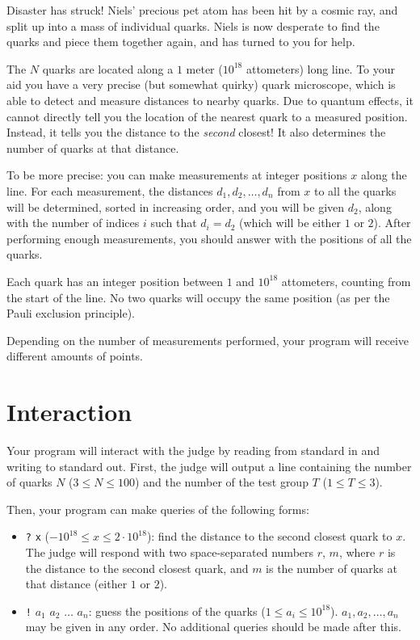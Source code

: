 Disaster has struck!
Niels' precious pet atom has been hit by a cosmic ray, and split up into a mass of individual quarks.
Niels is now desperate to find the quarks and piece them together again, and has turned to you for help.

The $N$ quarks are located along a $1$ meter ($10^{18}$ attometers) long line.
To your aid you have a very precise (but somewhat quirky) quark microscope, which is able to detect and measure distances to nearby quarks.
Due to quantum effects, it cannot directly tell you the location of the nearest quark to a measured position.
Instead, it tells you the distance to the \emph{second} closest!
It also determines the number of quarks at that distance.

To be more precise: you can make measurements at integer positions $x$ along the line.
For each measurement, the distances $d_1, d_2, \ldots, d_n$ from $x$ to all the quarks will be determined, sorted in increasing order,
and you will be given $d_2$, along with the number of indices $i$ such that $d_i = d_2$ (which will be either $1$ or $2$).
After performing enough measurements, you should answer with the positions of all the quarks.

Each quark has an integer position between $1$ and $10^{18}$ attometers, counting from the start of the line.
No two quarks will occupy the same position (as per the Pauli exclusion principle).

Depending on the number of measurements performed, your program will receive different amounts of points.

\section*{Interaction}
Your program will interact with the judge by reading from standard in and writing to standard out.
First, the judge will output a line containing the number of quarks $N$ ($3 \le N \le 100$) and the number of the test group $T$ ($1 \le T \le 3$).

Then, your program can make queries of the following forms:

\begin{itemize}
  \item \texttt{?} \texttt{x} ($-10^{18} \le x \le 2\cdot 10^{18}$): find the distance to the second closest quark to $x$.
    The judge will respond with two space-separated numbers $r$, $m$,
    where $r$ is the distance to the second closest quark, and $m$ is the number of quarks at that distance (either $1$ or $2$).
  \item \texttt{!} $a_1$ $a_2$ $\ldots$ $a_n$: guess the positions of the quarks ($1 \le a_i \le 10^{18}$).
    $a_1, a_2, \ldots, a_n$ may be given in any order.
    No additional queries should be made after this.
\end{itemize}

